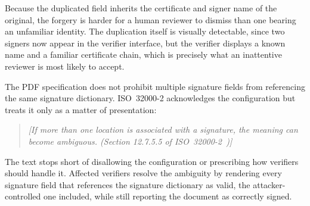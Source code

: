 \documentclass[12pt]{article}
\begin{document}
Because the duplicated field inherits the certificate and signer name of the original, the forgery is harder for a human reviewer to dismiss than one bearing an unfamiliar identity. The duplication itself is visually detectable, since two signers now appear in the verifier interface, but the verifier displays a known name and a familiar certificate chain, which is precisely what an inattentive reviewer is most likely to accept.

The PDF specification does not prohibit multiple signature fields from referencing the same signature dictionary. ISO~32000-2 acknowledges the configuration but treats it only as a matter of presentation:

\begin{quote}
	\emph{[If more than one location is associated with a signature, the meaning can become ambiguous. (Section 12.7.5.5 of ISO~32000-2~\cite{iso32000-2})]}
\end{quote}


The text stops short of disallowing the configuration or prescribing how verifiers should handle it. Affected verifiers resolve the ambiguity by rendering every signature field that references the signature dictionary as valid, the attacker-controlled one included, while still reporting the document as correctly signed.
\end{document}
